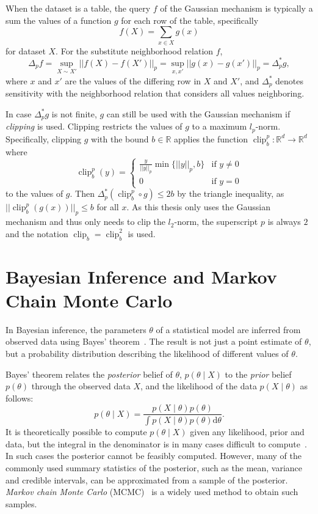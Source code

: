 \documentclass[english,twoside,openright]{HYgraduMLDS}
\newcommand{\R}{\mathbb{R}}
\newcommand{\dx}{\mathrm{d}}
\DeclareMathOperator{\clip}{clip}
\begin{document}
When the dataset is a table, the query \(f\) of the Gaussian mechanism is
typically a sum the values of a function \(g\) for each row of the table,
specifically
\[
  f(X) = \sum_{x\in X} g(x)
\]
for dataset \(X\).
For the substitute neighborhood relation \(f\),
\[
  \Delta_{p}f = \sup_{X\sim X'}||f(X) - f(X')||_{p}
  = \sup_{x, x'}||g(x) - g(x')||_{p}
  = \Delta^{*}_{p}g,
\]
where \(x\) and \(x'\) are the values of the differing row in \(X\) and \(X'\),
and \(\Delta^{*}_{p}\) denotes sensitivity with the neighborhood relation that
considers all values neighboring.

In case \(\Delta^{*}_{p}g\) is not finite, \(g\) can still be used with
the Gaussian mechanism if \emph{clipping} is used. Clipping restricts the
values of \(g\) to a maximum \(l_{p}\)-norm. Specifically, clipping
\(g\) with the bound \(b\in \R\) applies
the function \(\clip_{b}^{p}\colon \R^{d}\to \R^{d}\) where
\[
  \clip_{b}^{p}(y) =
  \begin{cases}
    \frac{y}{||y||_{p}}\min\{||y||_{p}, b\} & \text{if } y \neq 0\\
    0 & \text{if } y = 0
  \end{cases}
\]
to the values of \(g\). Then \(\Delta^{*}_{p}(\clip_{b}^{p} \circ g) \leq 2b\) by the
triangle inequality, as \(||\clip_{b}^{p}(g(x))||_{p} \leq b\) for
all \(x\). As this thesis only uses the Gaussian mechanism and
thus only needs to clip the \(l_{2}\)-norm, the superscript \(p\) is always
\(2\) and the notation \(\clip_{b} = \clip_{b}^{2}\) is used.

\section{Bayesian Inference and Markov Chain Monte Carlo}\label{MCMC_background}

In Bayesian inference, the parameters \(\theta\) of a statistical model are
inferred from 
observed data using Bayes' theorem~\cite{BDA}. The result is not just a point estimate 
of \(\theta\), but a probability distribution describing the likelihood
of different values of \(\theta\).

Bayes' theorem relates the \emph{posterior} belief of \(\theta\),
\(p(\theta \mid X)\) to the \emph{prior} belief \(p(\theta)\) through the 
observed data \(X\), and the likelihood of the data \(p(X\mid \theta)\) as follows:
\[
    p(\theta \mid X) = \frac{p(X \mid \theta)p(\theta)}
    {\int p(X\mid \theta)p(\theta)\dx\theta}.
\]
It is theoretically possible to compute \(p(\theta \mid X)\) given any 
likelihood, prior and data, but the integral in the denominator is in many 
cases difficult to compute~\cite{BDA}. In such cases the posterior cannot be feasibly 
computed. However, many of the commonly used summary statistics of the posterior, 
such as the mean, variance and credible intervals, can be approximated from 
a sample of the posterior. \emph{Markov chain Monte Carlo}
(MCMC)~\cite{MRR53} is a widely used method to obtain such samples.
\end{document}
